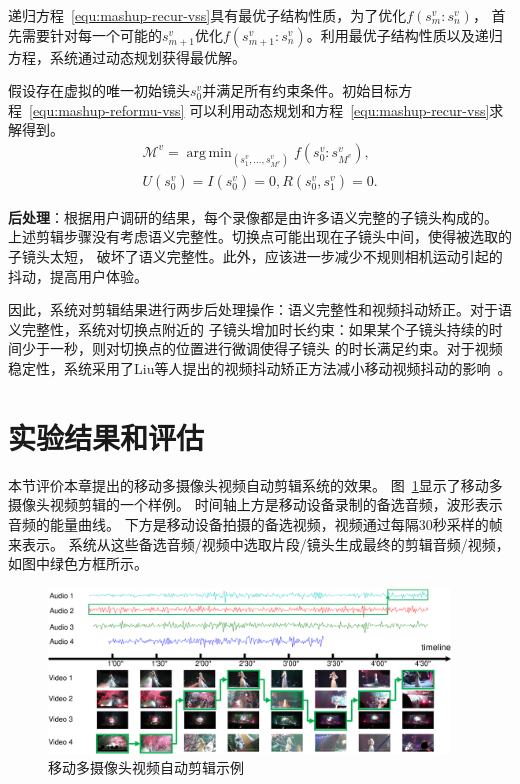 \documentclass[doctor]{ustcthesis}
\DeclareMathOperator*{\argmin}{arg\,min}
\begin{document}
递归方程~\eqref{equ:mashup-recur-vss}具有最优子结构性质，为了优化$f(s_m^v:s_n^v)$，
首先需要针对每一个可能的$s_{m+1}^v$优化$f(s_{m+1}^v:s_n^v)$。利用最优子结构性质以及递归方程，系统通过动态规划获得最优解。

假设存在虚拟的唯一初始镜头$s_0^v$并满足所有约束条件。初始目标方程~\eqref{equ:mashup-reformu-vss}
可以利用动态规划和方程~\eqref{equ:mashup-recur-vss}求解得到。
\begin{eqnarray}
    \mathcal{M}^v = \argmin_{(s_1^v, \ldots,
    s_{M^v}^v)}{f(s_0^v:s_{M^v}^v)}, \nonumber\\
    U(s_0^v) = I(s_0^v) = 0, R(s_0^v, s_1^v) = 0.
    \label{equ:mashup-vss-final-obj}
\end{eqnarray}

\textbf{后处理}：根据用户调研的结果，每个录像都是由许多语义完整的子镜头构成的。
上述剪辑步骤没有考虑语义完整性。切换点可能出现在子镜头中间，使得被选取的子镜头太短，
破坏了语义完整性。此外，应该进一步减少不规则相机运动引起的抖动，提高用户体验。

因此，系统对剪辑结果进行两步后处理操作：语义完整性和视频抖动矫正。对于语义完整性，系统对切换点附近的
子镜头增加时长约束：如果某个子镜头持续的时间少于一秒，则对切换点的位置进行微调使得子镜头
的时长满足约束。对于视频稳定性，系统采用了Liu等人提出的视频抖动矫正方法减小移动视频抖动的影响~\cite{liu2013bundled}。


\vspace{-1em}
\section{实验结果和评估}
本节评价本章提出的移动多摄像头视频自动剪辑系统的效果。
图~\ref{fig:mashup-example}显示了移动多摄像头视频剪辑的一个样例。
时间轴上方是移动设备录制的备选音频，波形表示音频的能量曲线。
下方是移动设备拍摄的备选视频，视频通过每隔30秒采样的帧来表示。
系统从这些备选音频/视频中选取片段/镜头生成最终的剪辑音频/视频，
如图中绿色方框所示。
\begin{figure}[t]
    \centering
    \includegraphics[clip=true, width=0.95\textwidth]{mashup-example.pdf}
    \caption{移动多摄像头视频自动剪辑示例}
    \label{fig:mashup-example}
    \vspace{-2em}
\end{figure}
\end{document}

